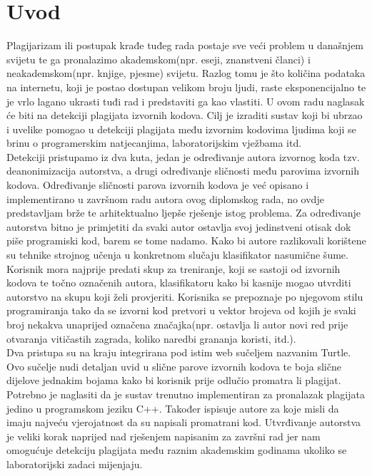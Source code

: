 \chapter*{Uvod}

	Plagijarizam ili postupak krađe tuđeg rada postaje sve veći problem u današnjem svijetu te ga pronalazimo akademskom(npr. eseji, znanstveni članci) i neakademskom(npr. knjige, pjesme) svijetu. Razlog tomu je što količina podataka na internetu, koji je postao dostupan velikom broju ljudi, raste eksponencijalno te je vrlo lagano ukrasti tuđi rad i predstaviti ga kao vlastiti. U ovom radu naglasak će biti na detekciji plagijata izvornih kodova. Cilj je izraditi sustav koji bi ubrzao i uvelike pomogao u detekciji plagijata među izvornim kodovima ljudima koji se brinu o programerskim natjecanjima, laboratorijskim vježbama itd. \\

	Detekciji pristupamo iz dva kuta, jedan je određivanje autora izvornog koda tzv. deanonimizacija autorstva, a drugi određivanje sličnosti među parovima izvornih kodova.   Određivanje sličnosti parova izvornih kodova je već opisano i implementirano u završnom radu autora ovog diplomskog rada, no ovdje predstavljam brže te arhitektualno ljepše rješenje istog problema. Za određivanje autorstva bitno je primjetiti da svaki autor ostavlja svoj jedinstveni otisak dok piše programiski kod, barem se tome nadamo. Kako bi autore razlikovali korištene su tehnike strojnog učenja u konkretnom slučaju klasifikator nasumične šume. Korisnik mora najprije predati skup za treniranje, koji se sastoji od izvornih kodova te točno označenih autora, klasifikatoru kako bi kasnije mogao utvrditi autorstvo na skupu koji želi provjeriti. Korisnika se prepoznaje po njegovom stilu programiranja tako da se izvorni kod pretvori u vektor brojeva od kojih je svaki broj nekakva unaprijed označena značajka(npr. ostavlja li autor novi red prije otvaranja vitičastih zagrada, koliko naredbi grananja koristi, itd.). \\

	Dva pristupa su na kraju integrirana pod istim web sučeljem nazvanim Turtle. Ovo sučelje nudi detaljan uvid u slične parove izvornih kodova te boja slične dijelove jednakim bojama kako bi korisnik prije odlučio promatra li plagijat. 
\newpage
{}	
\noindent Potrebno je naglasiti da je sustav trenutno implementiran za pronalazak plagijata jedino u programskom jeziku C++. Također ispisuje autore za koje misli da imaju najveću vjerojatnost da su napisali promatrani kod. Utvrđivanje autorstva je veliki korak naprijed nad rješenjem napisanim za završni rad jer nam omogućuje detekciju plagijata među raznim akademskim godinama ukoliko se laboratorijski zadaci mijenjaju.

